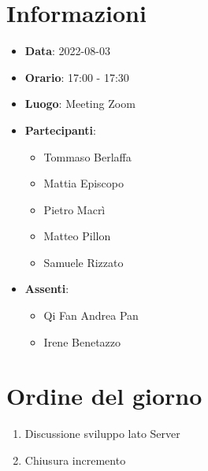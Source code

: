 \section{Informazioni}
	\begin{itemize}
		\item \textbf{Data}: 2022-08-03
		\item \textbf{Orario}: 17:00 - 17:30
		\item \textbf{Luogo}: Meeting Zoom
		\item \textbf{Partecipanti}:
		\begin{itemize}
			\item Tommaso Berlaffa
			\item Mattia Episcopo
			\item Pietro Macrì
			\item Matteo Pillon
			\item Samuele Rizzato
		\end{itemize}
        \item \textbf{Assenti}: 
        \begin{itemize}
			\item Qi Fan Andrea Pan
			\item Irene Benetazzo
		\end{itemize}
	\end{itemize}
    
	\section{Ordine del giorno}
	\begin{enumerate}
		\item Discussione sviluppo lato Server
		\item Chiusura incremento 
	\end{enumerate}
	\newpage